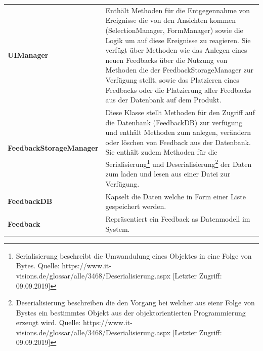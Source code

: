 \begin{tabularx}{\textwidth}{l X}
	\vspace{1mm}\textbf{UIManager} & Enthält Methoden für die Entgegennahme von Ereignisse die von den Ansichten kommen (SelectionManager, FormManager) sowie die Logik um auf diese Ereignisse zu reagieren. Sie verfügt über Methoden wie das Anlegen eines neuen Feedbacks über die Nutzung von Methoden die der FeedbackStorageManager zur Verfügung stellt, sowie das Platzieren eines Feedbacks oder die Platzierung aller Feedbacks aus der Datenbank auf dem Produkt. \\
	\vspace{1mm}\textbf{FeedbackStorageManager} & Diese Klasse stellt Methoden für den Zugriff auf die Datenbank (FeedbackDB) zur verfügung und enthält Methoden zum anlegen, verändern oder löschen von Feedback aus der Datenbank. Sie enthält zudem Methoden für die Serialisierung\footnote{Serialisierung  beschreibt die Umwandulung eines Objektes in eine Folge von Bytes. Quelle: https://www.it-visions.de/glossar/alle/3468/Deserialisierung.aspx [Letzter Zugriff: 09.09.2019]} und Deserialisierung\footnote{Deserialisierung beschreiben die den Vorgang bei welcher aus eienr Folge von Bystes ein bestimmtes Objekt aus der objektorientierten Programmierung erzeugt wird. Quelle: https://www.it-visions.de/glossar/alle/3468/Deserialisierung.aspx [Letzter Zugriff: 09.09.2019]} der Daten zum laden und lesen aus einer Datei zur Verfügung. \\
	\vspace{1mm}\textbf{FeedbackDB} & Kapselt die Daten welche in Form einer Liste gespeichert werden. \\
	\vspace{1mm}\textbf{Feedback} & Repräsentiert ein Feedback as Datenmodell im System.\\
\end{tabularx}
